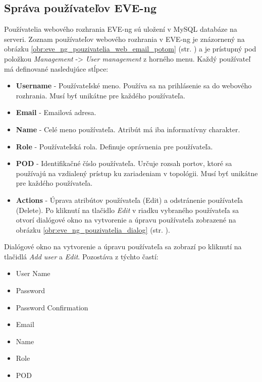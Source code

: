 \subsection{Správa používateľov EVE-ng}
\label{chap:sprava_pouzivatelov}

Používatelia webového rozhrania EVE-ng sú uložení v MySQL databáze na serveri. Zoznam používateľov webového rozhrania v EVE-ng je znázornený na obrázku \ref{obr:eve_ng_pouzivatelia_web_email_potom} (str. \pageref{obr:eve_ng_pouzivatelia_web_email_potom}) a je prístupný pod položkou \emph{Management} -> \emph{User management} z horného menu. Každý používateľ má definované nasledujúce stĺpce:

\begin{itemize}[noitemsep]
    \item \textbf{Username} - Používateľské meno. Používa sa na prihlásenie sa do webového rozhrania. Musí byť unikátne pre každého používateľa.
    \item \textbf{Email} - Emailová adresa.
    \item \textbf{Name} - Celé meno používateľa. Atribút má iba informatívny charakter.
    \item \textbf{Role} - Používateľská rola. Definuje oprávnenia pre používateľa.
    \item \textbf{POD} - Identifikačné číslo používateľa. Určuje rozsah portov, ktoré sa používajú na vzdialený prístup ku zariadeniam v topológii. Musí byť unikátne pre každého používateľa.
    \item \textbf{Actions} - Úprava atribútov používateľa (Edit) a odstránenie používateľa (Delete). Po kliknutí na tlačidlo \emph{Edit} v riadku vybraného používateľa sa otvorí dialógové okno na vytvorenie a úpravu používateľa zobrazené na obrázku \ref{obr:eve_ng_pouzivatelia_dialog} (str. \pageref{obr:eve_ng_pouzivatelia_dialog}).
\end{itemize}

Dialógové okno na vytvorenie a úpravu používateľa sa zobrazí po kliknutí na tlačidlá \emph{Add user} a \emph{Edit}. Pozostáva z týchto častí:

\begin{itemize}[noitemsep]
    \item User Name
    \item Password
    \item Password Confirmation
    \item Email
    \item Name
    \item Role
    \item POD
\end{itemize}

